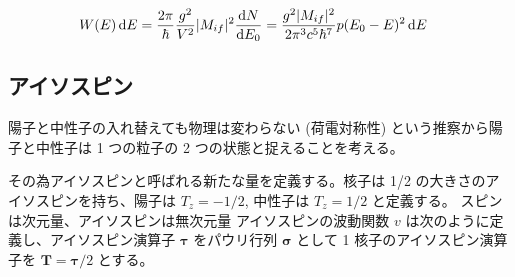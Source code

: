 \documentclass[uplatex,dvipdfmx,a4paper,11pt]{jlreq}
\numberwithin{equation}{section}
\theoremstyle{definition}
\begin{document}
\begin{align}
  W(E)\dl{E} & = \frac{2\pi}{\hbar}\frac{g^2}{V^2}|M_{if}|^2\diff{N}{E_0} = \frac{g^2|M_{if}|^2}{2\pi^3c^5\hbar^7}p(E_0 - E)^2\dl{E}
\end{align}



\subsection{アイソスピン}
陽⼦と中性⼦の⼊れ替えても物理は変わらない (荷電対称性) という推察から陽子と中性子は 1 つの粒子の 2 つの状態と捉えることを考える。

その為アイソスピンと呼ばれる新たな量を定義する。核子は 1/2 の大きさのアイソスピンを持ち、陽子は $T_z = -1/2$, 中性子は $T_z = 1/2$ と定義する。
スピンは次元量、アイソスピンは無次元量
アイソスピンの波動関数 $v$ は次のように定義し、アイソスピン演算子 $\bm{\tau}$ をパウリ行列 $\bm{\sigma}$ として 1 核子のアイソスピン演算子を $\bm{T} = \bm{\tau}/2$ とする。
\end{document}
